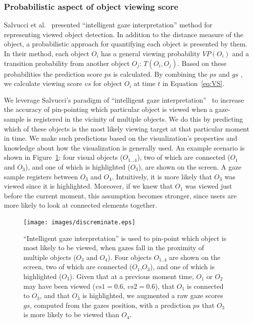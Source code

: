 \subsubsection{Probabilistic aspect of object viewing score}

Salvucci et al.~\cite{salvucci2000intelligent} presented ``intelligent gaze interpretation'' method for representing viewed object detection. In addition to the distance measure of the object, a probabilistic approach for quantifying each object is presented by them. In their method, each object $O_i$ has a general viewing probability $VP(O_i)$ and a transition probability from another object $O_j$: $T(O_i,O_j)$. Based on these probabilities the prediction score $ps$ is calculated. By combining the $ps$ and $gs$ , we calculate viewing score $vs$ for object $O_i$ at time $t$ in Equation~\ref{eq:VS}.

We leverage Salvucci's paradigm of ``intelligent gaze interpretation''~\cite{salvucci2000intelligent} to increase the accuracy of pin-pointing which particular object is viewed when a gaze-sample is registered in the vicinity of multiple objects. We do this by predicting which of these objects is the most likely viewing target at that particular moment in time. We make such predictions based on the visualization's properties and knowledge about how the visualization is generally used. An example scenario is shown in Figure~\ref{fig:discreminate}: four visual objects ($O_{1\ldots 4}$), two of which are connected ($O_1$ and $O_3$), and one of which is highlighted ($O_3$), are shown on the screen. A gaze sample registers between $O_3$ and $O_4$. Intuitively, it is more likely that $O_3$ was viewed since it is highlighted. Moreover, if we knew that $O_1$ was viewed just before the current moment, this assumption becomes stronger, since users are more likely to look at connected elements together. 

\begin{figure}[htb]
  \centering
  \texttt{[image: images/discreminate.eps]}
  \caption{``Intelligent gaze interpretation'' is used to pin-point which object is most likely to be viewed, when gazes fall in the proximity of multiple objects ($O_3$ and $O_4$). Four objects $O_{1..4}$ are shown on the screen, two of which are connected ($O_1$,$O_3$), and one of which is highlighted ($O_3$). Given that at a previous moment time, $O_1$ or $O_2$ may have been viewed ($vs1 = 0.6$, $vs2=0.6$), that $O_1$ is connected to $O_3$, and that $O_3$ is highlighted, we augmented a raw gaze scores $gs$, computed from the gazes position, with  a prediction $ps$ that $O_3$ is more likely to be viewed than $O_4$.}
	\label{fig:discreminate}
\end{figure}

